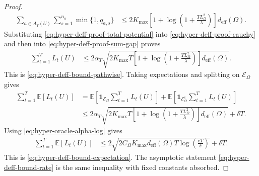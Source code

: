 \documentclass{article} %
\begin{document}
\begin{proof}
\begin{align}
\label{eq:hyper-deff-proof-total-potential}
\sum_{a\in A_T(U)}
\sum_{s=1}^{n_a}
\min\{1,q_{a,s}\}
&\le
2K_{\max}
\left[
1+\log\!\left(1+\frac{TL_{\Omega}^{2}}{\lambda}\right)
\right]
d_{\mathrm{eff}}(\Omega).
\end{align}
Substituting \eqref{eq:hyper-deff-proof-total-potential} into \eqref{eq:hyper-deff-proof-cauchy} and then into \eqref{eq:hyper-deff-proof-sum-gap} proves
\begin{align}
\label{eq:hyper-deff-proof-pathwise}
\sum_{t=1}^{T}L_t(U)
&\le
2\alpha_T
\sqrt{
2K_{\max}T
\left[
1+\log\!\left(1+\frac{TL_{\Omega}^{2}}{\lambda}\right)
\right]
d_{\mathrm{eff}}(\Omega)
}.
\end{align}
This is \eqref{eq:hyper-deff-bound-pathwise}.  Taking expectations and splitting on \(\mathcal{E}_{\Omega}\) gives
\begin{align}
\label{eq:hyper-deff-proof-expectation-split}
\sum_{t=1}^{T}\mathbb{E}[L_t(U)]
&=
\mathbb{E}
\!\left[
\mathbf{1}_{\mathcal{E}_{\Omega}}
\sum_{t=1}^{T}L_t(U)
\right]
+
\mathbb{E}
\!\left[
\mathbf{1}_{\mathcal{E}_{\Omega}^{c}}
\sum_{t=1}^{T}L_t(U)
\right]
\\
&\le
2\alpha_T
\sqrt{
2K_{\max}T
\left[
1+\log\!\left(1+\frac{TL_{\Omega}^{2}}{\lambda}\right)
\right]
d_{\mathrm{eff}}(\Omega)
}
+
\delta T .
\end{align}
Using \eqref{eq:hyper-oracle-alpha-log} gives
\begin{align}
\label{eq:hyper-deff-proof-final}
\sum_{t=1}^{T}\mathbb{E}[L_t(U)]
&\le
2
\sqrt{
2C_{\Omega}
K_{\max}
d_{\mathrm{eff}}(\Omega)
T
\log\!\left(\frac{eT}{\delta}\right)
}
+
\delta T .
\end{align}
This is \eqref{eq:hyper-deff-bound-expectation}.  The asymptotic statement \eqref{eq:hyper-deff-bound-rate} is the same inequality with fixed constants absorbed.
\end{proof}
\end{document}
